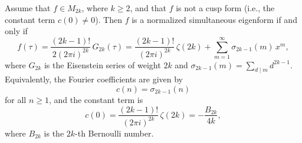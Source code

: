 Assume that $f \in M_{2k}$, where $k \geq 2$, and that $f$ is not a cusp form (i.e., the constant term $c(0) \neq 0$). Then $f$ is a normalized simultaneous eigenform if and only if
$$f(\tau) = \frac{(2k-1)!}{2(2\pi i)^{2k}} \, G_{2k}(\tau) = \frac{(2k-1)!}{(2\pi i)^{2k}} \,\zeta(2k) + \sum_{m=1}^{\infty} \sigma_{2k-1}(m)\,x^m,$$
where $G_{2k}$ is the Eisenstein series of weight $2k$ and $\sigma_{2k-1}(m) = \sum_{d \mid m} d^{2k-1}$. Equivalently, the Fourier coefficients are given by
$$c(n) = \sigma_{2k-1}(n)$$
for all $n \geq 1$, and the constant term is
$$c(0) = \frac{(2k-1)!}{(2\pi i)^{2k}} \,\zeta(2k) = -\frac{B_{2k}}{4k},$$
where $B_{2k}$ is the $2k$-th Bernoulli number.
